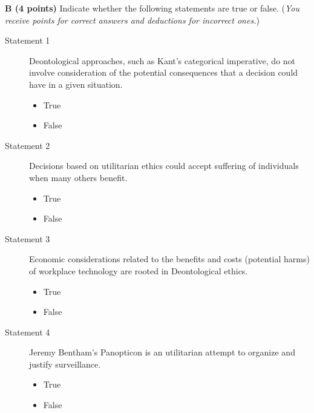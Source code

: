\documentclass[12pt]{scrartcl}
\begin{document}
\vspace{0.3cm}
\newpage
\textbf{B (4 points)} Indicate whether the following statements are true or false. (\textit{You receive points for correct answers and deductions for incorrect ones.})
\\
\begin{description}
	\item[Statement 1] Deontological approaches, such as Kant's categorical imperative, do not involve consideration of the potential consequences that a decision could have in a given situation.

\begin{multicols}{2}
	\begin{itemize}[label={\Square}]
		\item[\checkmark] True
		\item False
	\end{itemize}
\end{multicols}

\item[Statement 2] Decisions based on utilitarian ethics could accept suffering of individuals when many others benefit.

\begin{multicols}{2}
	\begin{itemize}[label={\Square}]
		\item[\checkmark] True
		\item False
	\end{itemize}
\end{multicols}

\item[Statement 3] Economic considerations related to the benefits and costs (potential harms) of workplace technology are rooted in Deontological ethics.

\begin{multicols}{2}
	\begin{itemize}[label={\Square}]
		\item True
		\item[\checkmark] False
	\end{itemize}
\end{multicols}

\item[Statement 4] Jeremy Bentham's Panopticon is an utilitarian attempt to organize and justify surveillance.

\begin{multicols}{2}
	\begin{itemize}[label={\Square}]
		\item[\checkmark] True
		\item False
	\end{itemize}
\end{multicols}

\end{description}
\end{document}
